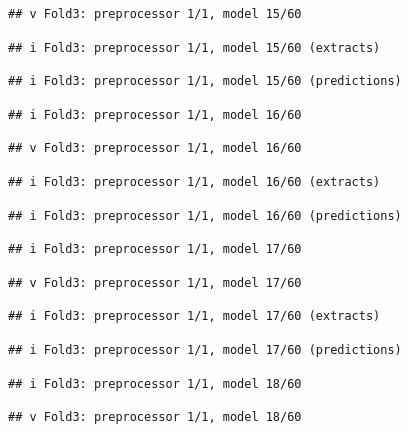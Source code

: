 \documentclass[
]{article}
\begin{document}
\begin{verbatim}
## v Fold3: preprocessor 1/1, model 15/60
\end{verbatim}

\begin{verbatim}
## i Fold3: preprocessor 1/1, model 15/60 (extracts)
\end{verbatim}

\begin{verbatim}
## i Fold3: preprocessor 1/1, model 15/60 (predictions)
\end{verbatim}

\begin{verbatim}
## i Fold3: preprocessor 1/1, model 16/60
\end{verbatim}

\begin{verbatim}
## v Fold3: preprocessor 1/1, model 16/60
\end{verbatim}

\begin{verbatim}
## i Fold3: preprocessor 1/1, model 16/60 (extracts)
\end{verbatim}

\begin{verbatim}
## i Fold3: preprocessor 1/1, model 16/60 (predictions)
\end{verbatim}

\begin{verbatim}
## i Fold3: preprocessor 1/1, model 17/60
\end{verbatim}

\begin{verbatim}
## v Fold3: preprocessor 1/1, model 17/60
\end{verbatim}

\begin{verbatim}
## i Fold3: preprocessor 1/1, model 17/60 (extracts)
\end{verbatim}

\begin{verbatim}
## i Fold3: preprocessor 1/1, model 17/60 (predictions)
\end{verbatim}

\begin{verbatim}
## i Fold3: preprocessor 1/1, model 18/60
\end{verbatim}

\begin{verbatim}
## v Fold3: preprocessor 1/1, model 18/60
\end{verbatim}
\end{document}
